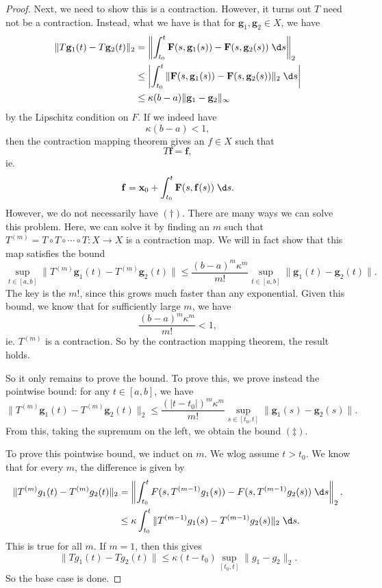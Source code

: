 \documentclass[a4paper]{article}
\begin{document}
\begin{proof}
  Next, we need to show this is a contraction. However, it turns out $T$ need not be a contraction. Instead, what we have is that for $\mathbf{g}_1, \mathbf{g}_2 \in X$, we have
  \begin{align*}
    \|T \mathbf{g}_1(t) - T\mathbf{g}_2(t)\|_2 &= \left\|\int_{t_0}^t \mathbf{F}(s, \mathbf{g}_1(s)) - \mathbf{F}(s, \mathbf{g}_2(s))\;\d s\right\|_2\\
    &\leq \left|\int_{t_0}^t \|\mathbf{F}(s, \mathbf{g}_1(s)) - \mathbf{F}(s, \mathbf{g}_2(s))\|_2 \;\d s \right|\\
    &\leq \kappa (b - a) \|\mathbf{g}_1 - \mathbf{g}_2\|_\infty
  \end{align*}
  by the Lipschitz condition on $F$. If we indeed have
  \[
    \kappa (b - a) < 1 \tag{$\dagger$},
  \]
  then the contraction mapping theorem gives an $f \in X$ such that
  \[
    T\mathbf{f} = \mathbf{f},
  \]
  ie.
  \[
    \mathbf{f} = \mathbf{x}_0 + \int_{t_0}^t \mathbf{F}(s, \mathbf{f}(s))\;\d s.
  \]
  However, we do not necessarily have $(\dagger)$. There are many ways we can solve this problem. Here, we can solve it by finding an $m$ such that $T^{(m)} = T\circ T \circ \cdots \circ T: X \to X$ is a contraction map. We will in fact show that this map satisfies the bound
  \[
    \sup_{t \in [a, b]} \|T^{(m)}\mathbf{g}_1(t) - T^{(m)}\mathbf{g}_2(t)\| \leq \frac{(b - a)^m \kappa^m}{m!} \sup_{t \in [a, b]} \|\mathbf{g}_1(t) - \mathbf{g}_2(t)\|. \tag{$\ddag$}
  \]
  The key is the $m!$, since this grows much faster than any exponential. Given this bound, we know that for sufficiently large $m$, we have
  \[
    \frac{(b - a)^m \kappa^m}{m!} < 1,
  \]
  ie. $T^{(m)}$ is a contraction. So by the contraction mapping theorem, the result holds.

  So it only remains to prove the bound. To prove this, we prove instead the pointwise bound: for any $t \in [a, b]$, we have
  \[
    \|T^{(m)}\mathbf{g}_1(t) - T^{(m)}\mathbf{g}_2(t)\|_2 \leq \frac{(|t - t_0|)^m \kappa^m}{m!} \sup_{s \in [t_0, t]}\|\mathbf{g}_1(s) - \mathbf{g}_2(s)\|.
  \]
  From this, taking the supremum on the left, we obtain the bound $(\ddag)$.

  To prove this pointwise bound, we induct on $m$. We wlog assume $t > t_0$. We know that for every $m$, the difference is given by
  \begin{align*}
    \|T^{(m)}g_1(t) - T^{(m)}g_2(t)\|_2 &= \left\|\int_{t_0}^t F(s, T^{(m - 1)}g_1(s)) - F(s, T^{(m - 1)} g_2(s))\;\d s\right\|_2.\\
    &\leq \kappa\int_{t_0}^t \|T^{(m - 1)} g_1(s) - T^{(m - 1)} g_2(s)\|_2 \;\d s.
  \end{align*}
  This is true for all $m$. If $m = 1$, then this gives
  \[
    \|T g_1(t) - T g_2(t)\| \leq \kappa(t - t_0) \sup_{[t_0, t]} \|g_1 - g_2\|_2.
  \]
  So the base case is done.


\end{proof}
\end{document}
